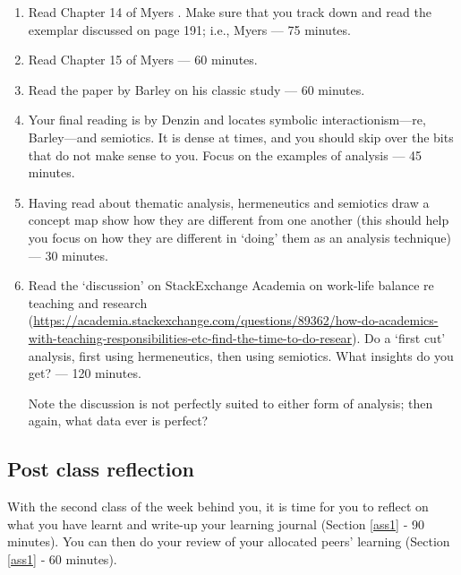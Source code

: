 \documentclass[]{book}
\theoremstyle{definition}
\theoremstyle{definition}
\theoremstyle{definition}
\theoremstyle{remark}
\begin{document}
\begin{enumerate}
\def\labelenumi{\arabic{enumi}.}
\item
  Read Chapter 14 of Myers \autocite*[
  p.~183--196]{myers_2013_qualitativeresearchbusiness}. Make sure that
  you track down and read the exemplar discussed on page 191; i.e.,
  Myers \autocite*{myers_1994_disastereveryonesee} --- 75 minutes.
\item
  Read Chapter 15 of Myers \autocite*[
  p.~197--208]{myers_2013_qualitativeresearchbusiness} --- 60 minutes.
\item
  Read the paper by Barley \autocite*{barley_1990_imagesimagingnotes} on
  his classic study \autocite*[ which you do not need to
  read]{barley_1986_technologyoccasionstructuring} --- 60 minutes.
\item
  Your final reading is by Denzin
  \autocite*{denzin_1987_semioticssymbolicinteractionism} and locates
  symbolic interactionism---re, Barley---and semiotics. It is dense at
  times, and you should skip over the bits that do not make sense to
  you. Focus on the examples of analysis --- 45 minutes.
\item
  Having read about thematic analysis, hermeneutics and semiotics draw a
  concept map show how they are different from one another (this should
  help you focus on how they are different in `doing' them as an
  analysis technique) --- 30 minutes.
\item
  Read the `discussion' on StackExchange Academia on work-life balance
  re teaching and research
  (\url{https://academia.stackexchange.com/questions/89362/how-do-academics-with-teaching-responsibilities-etc-find-the-time-to-do-resear}).
  Do a `first cut' analysis, first using hermeneutics, then using
  semiotics. What insights do you get? --- 120 minutes.

  Note the discussion is not perfectly suited to either form of
  analysis; then again, what data ever is perfect?
\end{enumerate}

\hypertarget{post-class-reflection-7}{%
\subsection*{Post class reflection}\label{post-class-reflection-7}}

With the second class of the week behind you, it is time for you to
reflect on what you have learnt and write-up your learning journal
(Section \ref{ass1} ‐ 90 minutes). You can then do your review of your
allocated peers' learning (Section \ref{ass1} ‐ 60 minutes).
\end{document}
